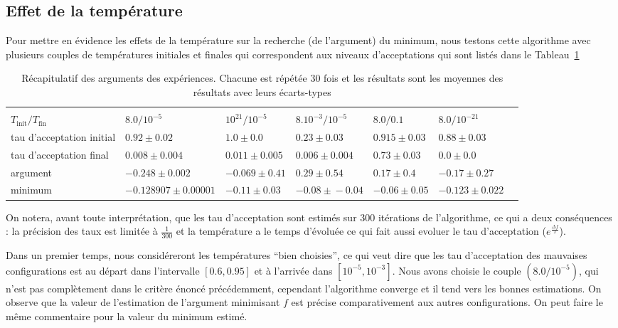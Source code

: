 \documentclass[10pt,a4paper]{article}
\begin{document}
\subsection{Effet de la température}
Pour mettre en évidence les effets de la température sur la recherche (de l'argument) du minimum, nous testons cette algorithme avec plusieurs couples de températures initiales et finales qui correspondent aux niveaux d'acceptations qui sont listés dans le Tableau~\ref{argumentEtTau}
\begin{table}[h] 
	\centering
	\caption{Récapitulatif des arguments des expériences. Chacune est répétée 30 fois et les résultats sont les moyennes des résultats avec leurs écarts-types}
\begin{footnotesize}
   \begin{tabular}{|l|l|l|l|l|l|l|}%
        \hline\vspace{-3mm}
         &  &  & & & \\
        $T_{\text{init}}/T_{\text{fin}}$ & $8.0/10^{-5}$ & $10^{21}/10^{-5}$ & $8.10^{-3}/10^{-5}$ & $8.0/0.1$ & $8.0/10^{-21}$\\\hline
        tau d'acceptation initial   & $0.92\!\pm\!0.02$  &  $1.0\!\pm\!0.0$  &   $0.23\!\pm\!0.03$ &   $0.915\!\pm\!0.03$ &   $0.88\!\pm\!0.03$\\ 
        tau d'acceptation final   & $0.008\!\pm\!0.004$  &  $0.011\!\pm\!0.005$  &   $0.006\!\pm\!0.004$ &   $0.73\!\pm\!0.03$ &   $0.0\!\pm\!0.0$\\ 
        argument      & $-0.248\!\pm\!0.002$    &  $-0.069\!\pm\!0.41$    &   $0.29\!\pm\!0.54$  &   $0.17\!\pm\!0.4$ &   $-0.17\!\pm\!0.27$ \\
        minimum       & $-0.128907\!\pm\!0.00001$  &  $-0.11\!\pm\!0.03$  &   $-0.08\!\pm\!-0.04$ &   $-0.06\!\pm\!0.05$ &   $-0.123\!\pm\!0.022$\\
        \hline
    \end{tabular}
\end{footnotesize}
	\label{argumentEtTau}
\end{table}
On notera, avant toute interprétation, que les tau d'acceptation sont estimés  sur 300 itérations de l'algorithme, ce qui a deux conséquences : la précision des taux est limitée à $\frac{1}{300}$ et la température a le temps d’évoluée ce qui fait aussi evoluer le tau d'acceptation ($e^{\frac{\Delta f}{T}}$).

Dans un premier temps, nous considéreront les températures ``bien choisies'', ce qui veut dire que les tau d'acceptation des mauvaises configurations est au départ dans l'intervalle $[0.6,0.95]$ et à l’arrivée dans $[10^{-5},10^{-3}]$. Nous avons choisie le couple $(8.0/10^{-5})$, qui n'est pas complètement dans le critère énoncé précédemment, cependant l'algorithme converge et il tend vers les bonnes estimations. On observe que la valeur de l'estimation de l'argument minimisant $f$ est précise comparativement aux autres configurations. On peut faire le même commentaire pour la valeur du minimum estimé.
\end{document}
